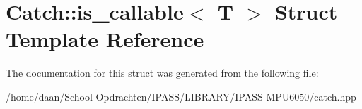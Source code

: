 \hypertarget{structCatch_1_1is__callable}{}\section{Catch\+:\+:is\+\_\+callable$<$ T $>$ Struct Template Reference}
\label{structCatch_1_1is__callable}


The documentation for this struct was generated from the following file\+:\begin{DoxyCompactItemize}
\item 
/home/daan/\+School Opdrachten/\+I\+P\+A\+S\+S/\+L\+I\+B\+R\+A\+R\+Y/\+I\+P\+A\+S\+S-\/\+M\+P\+U6050/catch.\+hpp\end{DoxyCompactItemize}
